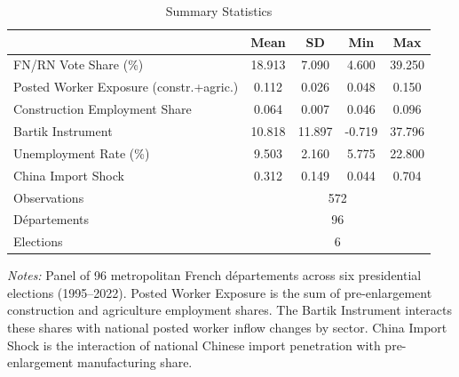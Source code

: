 \begin{table}[htbp]
\centering
\caption{Summary Statistics}
\label{tab:summary}
\begin{tabular}{lcccc}
\toprule
 & Mean & SD & Min & Max \\
\midrule
FN/RN Vote Share (\%) & 18.913 & 7.090 & 4.600 & 39.250 \\
Posted Worker Exposure (constr.+agric.) & 0.112 & 0.026 & 0.048 & 0.150 \\
Construction Employment Share & 0.064 & 0.007 & 0.046 & 0.096 \\
Bartik Instrument & 10.818 & 11.897 & -0.719 & 37.796 \\
Unemployment Rate (\%) & 9.503 & 2.160 & 5.775 & 22.800 \\
China Import Shock & 0.312 & 0.149 & 0.044 & 0.704 \\
\midrule
Observations & \multicolumn{4}{c}{572} \\
D\'epartements & \multicolumn{4}{c}{96} \\
Elections & \multicolumn{4}{c}{6} \\
\bottomrule
\end{tabular}
\begin{tablenotes}[flushleft]\small
\item \textit{Notes:} Panel of 96 metropolitan French d\'epartements across six presidential elections (1995--2022). Posted Worker Exposure is the sum of pre-enlargement construction and agriculture employment shares. The Bartik Instrument interacts these shares with national posted worker inflow changes by sector. China Import Shock is the interaction of national Chinese import penetration with pre-enlargement manufacturing share.
\end{tablenotes}
\end{table}
